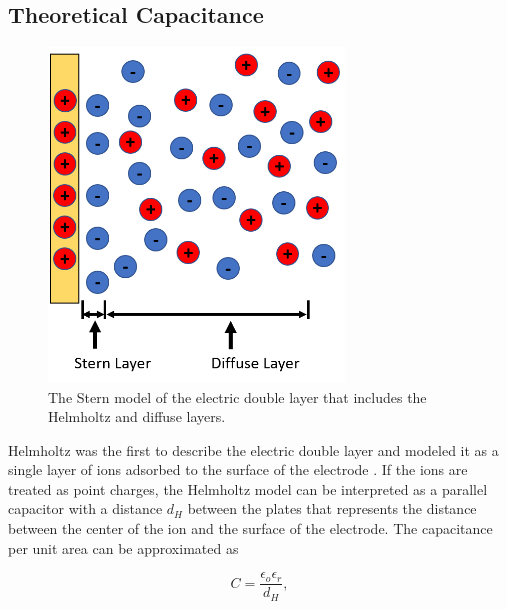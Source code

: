 \subsection{Theoretical Capacitance}


\begin{figure}[h]
    \centering
    \includegraphics[width=0.7\textwidth]{images/electricDoubleLayer.png}
    \caption[Stern model of the electric double layer]{The Stern model of the electric double layer that includes the Helmholtz and diffuse layers.}
    \label{fig:electric_double_layer}
\end{figure}

\par Helmholtz was the first to describe the electric double layer and modeled it as a single layer of ions adsorbed to the surface of the electrode \cite{ishai_electrode_2013}. If the ions are treated as point charges, the Helmholtz model can be interpreted as a parallel capacitor with a distance $d_H$ between the plates that represents the distance between the center of the ion and the surface of the electrode. The capacitance per unit area can be approximated as

\begin{equation}
    C = \frac{\epsilon_o\epsilon_r}{d_H},
\end{equation}

